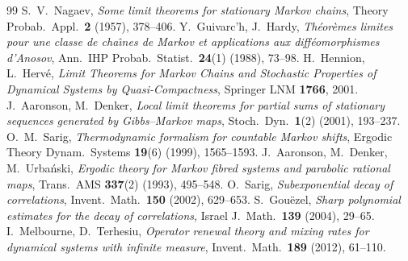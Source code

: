 \documentclass[11pt]{article}
\begin{document}
\begin{thebibliography}{99}
 S.\ V.\ Nagaev, \emph{Some limit theorems for stationary Markov chains}, Theory Probab.\ Appl.\ \textbf{2} (1957), 378--406.
 Y.\ Guivarc'h, J.\ Hardy, \emph{Th\'eor\`emes limites pour une classe de cha\^\i nes de Markov et applications aux diff\'eomorphismes d'Anosov}, Ann.\ IHP Probab.\ Statist.\ \textbf{24}(1) (1988), 73--98.
 H.\ Hennion, L.\ Herv\'e, \emph{Limit Theorems for Markov Chains and Stochastic Properties of Dynamical Systems by Quasi-Compactness}, Springer LNM \textbf{1766}, 2001.
 J.\ Aaronson, M.\ Denker, \emph{Local limit theorems for partial sums of stationary sequences generated by Gibbs--Markov maps}, Stoch.\ Dyn.\ \textbf{1}(2) (2001), 193--237.
 O.\ M.\ Sarig, \emph{Thermodynamic formalism for countable Markov shifts}, Ergodic Theory Dynam.\ Systems \textbf{19}(6) (1999), 1565--1593.
 J.\ Aaronson, M.\ Denker, M.\ Urba\'nski, \emph{Ergodic theory for Markov fibred systems and parabolic rational maps}, Trans.\ AMS \textbf{337}(2) (1993), 495--548.
 O.\ Sarig, \emph{Subexponential decay of correlations}, Invent.\ Math.\ \textbf{150} (2002), 629--653.
 S.\ Gou\"ezel, \emph{Sharp polynomial estimates for the decay of correlations}, Israel J.\ Math.\ \textbf{139} (2004), 29--65.
 I.\ Melbourne, D.\ Terhesiu, \emph{Operator renewal theory and mixing rates for dynamical systems with infinite measure}, Invent.\ Math.\ \textbf{189} (2012), 61--110.
\end{thebibliography}
\end{document}
